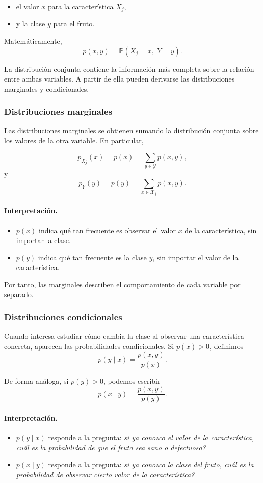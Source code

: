 \documentclass{article}
\begin{document}
\begin{itemize}
\item el valor \(x\) para la característica \(X_j\),
\item y la clase \(y\) para el fruto.
\end{itemize}

Matemáticamente,
\[
p(x,y)=\mathbb{P}(X_j=x,\;Y=y).
\]

La distribución conjunta contiene la información más completa sobre la relación entre ambas variables. A partir de ella pueden derivarse las distribuciones marginales y condicionales.

\subsubsection*{Distribuciones marginales}

Las distribuciones marginales se obtienen sumando la distribución conjunta sobre los valores de la otra variable. En particular,

\[
p_{X_j}(x)=p(x)=\sum_{y\in\mathcal{Y}} p(x,y),
\]
y
\[
p_Y(y)=p(y)=\sum_{x\in\mathcal{X}_j} p(x,y).
\]

\paragraph{Interpretación.}
\begin{itemize}
\item \(p(x)\) indica qué tan frecuente es observar el valor \(x\) de la característica, sin importar la clase.
\item \(p(y)\) indica qué tan frecuente es la clase \(y\), sin importar el valor de la característica.
\end{itemize}

Por tanto, las marginales describen el comportamiento de cada variable por separado.

\subsubsection*{Distribuciones condicionales}

Cuando interesa estudiar cómo cambia la clase al observar una característica concreta, aparecen las probabilidades condicionales. Si \(p(x)>0\), definimos
\[
p(y\mid x)=\frac{p(x,y)}{p(x)}.
\]

De forma análoga, si \(p(y)>0\), podemos escribir
\[
p(x\mid y)=\frac{p(x,y)}{p(y)}.
\]

\paragraph{Interpretación.}
\begin{itemize}
\item \(p(y\mid x)\) responde a la pregunta: \emph{si ya conozco el valor de la característica, cuál es la probabilidad de que el fruto sea sano o defectuoso?}
\item \(p(x\mid y)\) responde a la pregunta: \emph{si ya conozco la clase del fruto, cuál es la probabilidad de observar cierto valor de la característica?}
\end{itemize}
\end{document}
